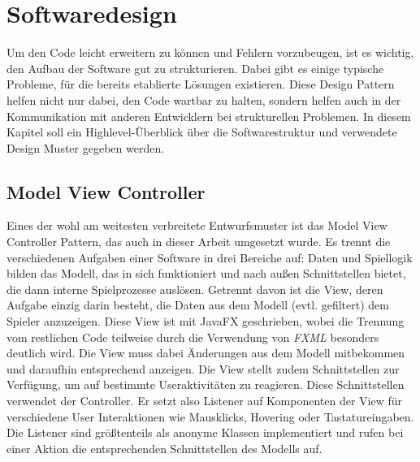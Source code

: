 \section{Softwaredesign} %
\label{sec:softwaredesign}

Um den Code leicht erweitern zu können und Fehlern vorzubeugen, ist es wichtig, den Aufbau der Software gut zu strukturieren. Dabei gibt es einige typische Probleme, für die bereits etablierte Lösungen existieren. Diese Design Pattern helfen nicht nur dabei, den Code wartbar zu halten, sondern helfen auch in der Kommunikation mit anderen Entwicklern bei strukturellen Problemen. In diesem Kapitel soll ein Highlevel-Überblick über die Softwarestruktur und verwendete Design Muster gegeben werden.

\subsection{Model View Controller} %
\label{sub:model_view_controller}
Eines der wohl am weitesten verbreitete Entwurfsmuster ist das Model View Controller Pattern, das auch in dieser Arbeit umgesetzt wurde. Es trennt die verschiedenen Aufgaben einer Software in drei Bereiche auf: Daten und Spiellogik bilden das Modell, das in sich funktioniert und nach außen Schnittstellen bietet, die dann interne Spielprozesse auslösen. Getrennt davon ist die View, deren Aufgabe einzig darin besteht, die Daten aus dem Modell (evtl. gefiltert) dem Spieler anzuzeigen. Diese View ist mit JavaFX geschrieben, wobei die Trennung vom restlichen Code teilweise durch die Verwendung von \emph{FXML} besonders deutlich wird. Die View muss dabei Änderungen aus dem Modell mitbekommen und daraufhin entsprechend anzeigen. Die View stellt zudem Schnittstellen zur Verfügung, um auf bestimmte Useraktivitäten zu reagieren. Diese Schnittstellen verwendet der Controller. Er setzt also Listener auf Komponenten der View für verschiedene User Interaktionen wie Mausklicks, Hovering oder Tastatureingaben. Die Listener sind größtenteils als anonyme Klassen implementiert und rufen bei einer Aktion die entsprechenden Schnittstellen des Modells auf.  

